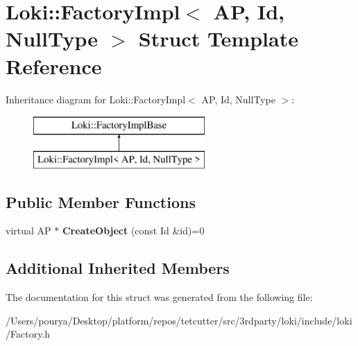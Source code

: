 \hypertarget{structLoki_1_1FactoryImpl_3_01AP_00_01Id_00_01NullType_01_4}{}\section{Loki\+:\+:Factory\+Impl$<$ A\+P, Id, Null\+Type $>$ Struct Template Reference}
\label{structLoki_1_1FactoryImpl_3_01AP_00_01Id_00_01NullType_01_4}
Inheritance diagram for Loki\+:\+:Factory\+Impl$<$ A\+P, Id, Null\+Type $>$\+:\begin{figure}[H]
\begin{center}
\leavevmode
\includegraphics[height=2.000000cm]{structLoki_1_1FactoryImpl_3_01AP_00_01Id_00_01NullType_01_4}
\end{center}
\end{figure}
\subsection*{Public Member Functions}
\begin{DoxyCompactItemize}
\item 
\hypertarget{structLoki_1_1FactoryImpl_3_01AP_00_01Id_00_01NullType_01_4_a49ff09aa69386937676c3ec5c9a47cbe}{}virtual A\+P $\ast$ {\bfseries Create\+Object} (const Id \&id)=0\label{structLoki_1_1FactoryImpl_3_01AP_00_01Id_00_01NullType_01_4_a49ff09aa69386937676c3ec5c9a47cbe}

\end{DoxyCompactItemize}
\subsection*{Additional Inherited Members}


The documentation for this struct was generated from the following file\+:\begin{DoxyCompactItemize}
\item 
/\+Users/pourya/\+Desktop/platform/repos/tetcutter/src/3rdparty/loki/include/loki/Factory.\+h\end{DoxyCompactItemize}

